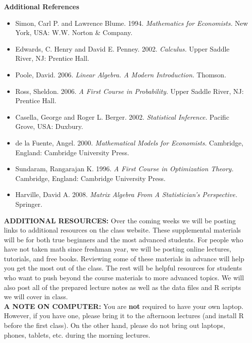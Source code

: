 \documentclass[12pt,a4paper]{article}
\begin{document}
\textbf{Additional References}
\begin{itemize}
\item Simon, Carl P. and Lawrence Blume. 1994. \textit{Mathematics for Economists.} New York, USA: W.W. Norton \& Company.
\item Edwards, C. Henry and David E. Penney. 2002. \textit{Calculus.} Upper Saddle River, NJ: Prentice Hall.
\item Poole, David. 2006. \textit{Linear Algebra. A Modern Introduction.} Thomson.
\item Ross, Sheldon. 2006. \textit{A First Course in Probability.} Upper Saddle River, NJ: Prentice Hall.
\item Casella, George and Roger L. Berger. 2002. \textit{Statistical Inference.} Pacific Grove, USA: Duxbury.
\item de la Fuente, Angel. 2000. \textit{Mathematical Models for Economists.} Cambridge, England: Cambridge University Press.
\item Sundaram, Rangarajan K. 1996. \textit{A First Course in Optimization Theory.} Cambridge, England: Cambridge University Press.
\item Harville, David A. 2008. \textit{Matrix Algebra From A Statistician's Perspective.} Springer.
\end{itemize}


\mbox{}
\textbf{ADDITIONAL RESOURCES:} Over the coming weeks we will be posting links to additional resources on the class website. These supplemental materials will be for both true beginners and the most advanced students. For people who have not taken math since freshman year, we will be posting online lectures, tutorials, and free books. Reviewing some of these materials in advance will help you get the most out of the class. The rest will be helpful resources for students who want to push beyond the course materials to more advanced topics. We will also post all of the prepared lecture notes as well as the data files and R scripts we will cover in class.\\

\textbf{A NOTE ON COMPUTER:} You are \textbf{not} required to have your own laptop. However, if you have one, please bring it to the afternoon lectures (and install R before the first class). On the other hand, please do not bring out laptops, phones, tablets, etc. during the morning lectures.\\

\end{document}
